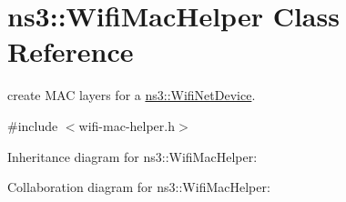 \hypertarget{classns3_1_1WifiMacHelper}{}\section{ns3\+:\+:Wifi\+Mac\+Helper Class Reference}
\label{classns3_1_1WifiMacHelper}


create M\+AC layers for a \hyperlink{classns3_1_1WifiNetDevice}{ns3\+::\+Wifi\+Net\+Device}.  




{\ttfamily \#include $<$wifi-\/mac-\/helper.\+h$>$}



Inheritance diagram for ns3\+:\+:Wifi\+Mac\+Helper\+:


Collaboration diagram for ns3\+:\+:Wifi\+Mac\+Helper\+:
